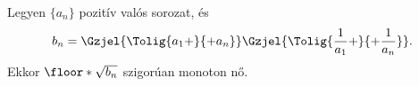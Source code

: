 Legyen $\{ a_{n} \}$ pozitív valós sorozat, és
$$
b_{n} = \Gzjel{ \Tolig{a_{1}+}{+a_{n}}}\Gzjel{ \Tolig{\frac{1}{a_{1}}+}{+\frac{1}{a_{n}}}}.
$$
Ekkor $\floor*{\sqrt{b_{n}}}$ szigorúan monoton nő.
